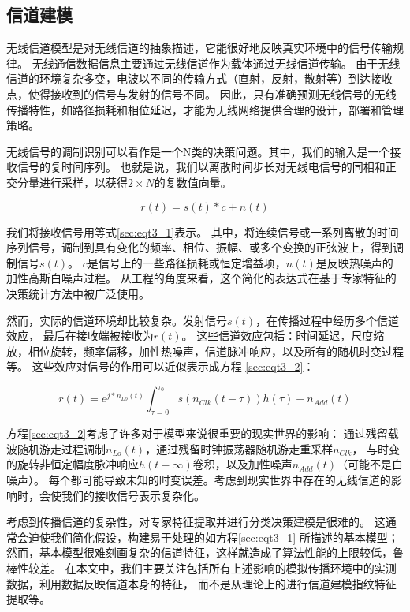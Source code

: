 \subsection{信道建模}

无线信道模型是对无线信道的抽象描述，它能很好地反映真实环境中的信号传输规律。
无线通信数据信息主要通过无线信道作为载体通过无线信道传输。 
由于无线信道的环境复杂多变，电波以不同的传输方式（直射，反射，散射等）到达接收点，使得接收到的信号与发射的信号不同。
因此，只有准确预测无线信号的无线传播特性，如路径损耗和相位延迟，才能为无线网络提供合理的设计，部署和管理策略。\par

无线信号的调制识别可以看作是一个N类的决策问题。其中，我们的输入是一个接收信号的复时间序列。
也就是说，我们以离散时间步长对无线电信号的同相和正交分量进行采样，以获得$2 \times N$的复数值向量。\par

\begin{equation}\label{sec:eqt3_1}
r(t) = s(t)*c + n(t)
\end{equation}

我们将接收信号用等式\ref{sec:eqt3_1}表示。
其中，将连续信号或一系列离散的时间序列信号，调制到具有变化的频率、相位、振幅、或多个变换的正弦波上，得到调制信号$s(t)$。
 $c$是信号上的一些路径损耗或恒定增益项，$n(t)$是反映热噪声的加性高斯白噪声过程。
 从工程的角度来看，这个简化的表达式在基于专家特征的决策统计方法中被广泛使用。\par

然而，实际的信道环境却比较复杂。发射信号$s(t)$，在传播过程中经历多个信道效应， 最后在接收端被接收为$r(t)$。
这些信道效应包括：时间延迟，尺度缩放，相位旋转，频率偏移，加性热噪声，信道脉冲响应，以及所有的随机时变过程等。 
这些效应对信号的作用可以近似表示成方程 \ref{sec:eqt3_2}：\par

\begin{equation}\label{sec:eqt3_2}
	r(t) = e^{j*n_{Lo}(t)} \int_{\tau=0}^{\tau_{0}} s(n_{Clk}(t-\tau))h(\tau) + n_{Add}(t)
\end{equation}

方程\ref{sec:eqt3_2}考虑了许多对于模型来说很重要的现实世界的影响：
通过残留载波随机游走过程调制$n_{Lo}(t)$，通过残留时钟振荡器随机游走重采样$n_{Clk}$，
与时变的旋转非恒定幅度脉冲响应$h(t-∞)$卷积，以及加性噪声$n_{Add}(t)$（可能不是白噪声）。
每个都可能导致未知的时变误差。考虑到现实世界中存在的无线信道的影响时，会使我们的接收信号表示复杂化。\par

考虑到传播信道的复杂性，对专家特征提取并进行分类决策建模是很难的。
这通常会迫使我们简化假设，构建易于处理的如方程\ref{sec:eqt3_1} 所描述的基本模型；
然而，基本模型很难刻画复杂的信道特征，这样就造成了算法性能的上限较低，鲁棒性较差。
在本文中，我们主要关注包括所有上述影响的模拟传播环境中的实测数据，利用数据反映信道本身的特征，
而不是从理论上的进行信道建模指纹特征提取等。\par

